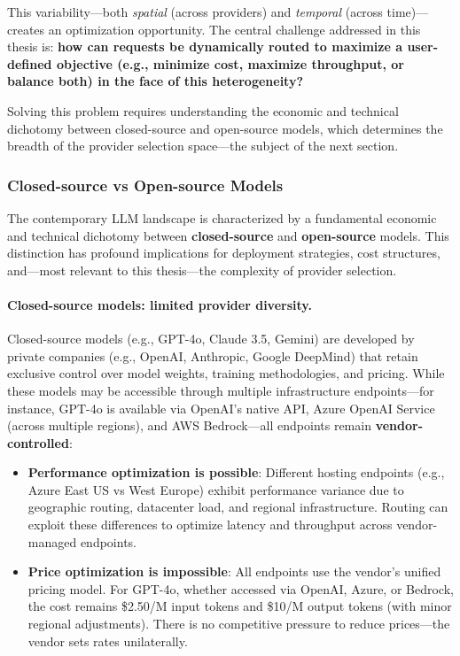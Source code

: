 \documentclass[english]{article}
\begin{document}
This variability—both \emph{spatial} (across providers) and \emph{temporal} (across time)—creates an optimization opportunity. The central challenge addressed in this thesis is: \textbf{how can requests be dynamically routed to maximize a user-defined objective (e.g., minimize cost, maximize throughput, or balance both) in the face of this heterogeneity?}

Solving this problem requires understanding the economic and technical dichotomy between closed-source and open-source models, which determines the breadth of the provider selection space—the subject of the next section.

\subsubsection{Closed-source vs Open-source Models}

The contemporary LLM landscape is characterized by a fundamental economic and technical dichotomy between \textbf{closed-source} and \textbf{open-source} models. This distinction has profound implications for deployment strategies, cost structures, and—most relevant to this thesis—the complexity of provider selection.

\paragraph{Closed-source models: limited provider diversity.}

Closed-source models (e.g., GPT-4o, Claude 3.5, Gemini) are developed by private companies (e.g., OpenAI, Anthropic, Google DeepMind) that retain exclusive control over model weights, training methodologies, and pricing. While these models may be accessible through multiple infrastructure endpoints—for instance, GPT-4o is available via OpenAI's native API, Azure OpenAI Service (across multiple regions), and AWS Bedrock—all endpoints remain \textbf{vendor-controlled}:

\begin{itemize}
    \item \textbf{Performance optimization is possible}: Different hosting endpoints (e.g., Azure East US vs West Europe) exhibit performance variance due to geographic routing, datacenter load, and regional infrastructure. Routing can exploit these differences to optimize latency and throughput across vendor-managed endpoints.

    \item \textbf{Price optimization is impossible}: All endpoints use the vendor's unified pricing model. For GPT-4o, whether accessed via OpenAI, Azure, or Bedrock, the cost remains \$2.50/M input tokens and \$10/M output tokens (with minor regional adjustments). There is no competitive pressure to reduce prices—the vendor sets rates unilaterally.
\end{itemize}
\end{document}
